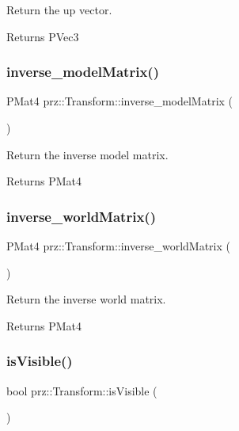 Return the up vector. 

\begin{DoxyReturn}{Returns}
P\+Vec3 
\end{DoxyReturn}
\mbox{\label{classprz_1_1_transform_a7d3ed4bf1ab8efed786e48632b70422e}} 
\subsubsection{\texorpdfstring{inverse\_modelMatrix()}{inverse\_modelMatrix()}}
{\footnotesize\ttfamily P\+Mat4 prz\+::\+Transform\+::inverse\+\_\+model\+Matrix (\begin{DoxyParamCaption}{ }\end{DoxyParamCaption})}



Return the inverse model matrix. 

\begin{DoxyReturn}{Returns}
P\+Mat4 
\end{DoxyReturn}
\mbox{\label{classprz_1_1_transform_a729dc939d6f4ac013bcf2a675c5521c4}} 
\subsubsection{\texorpdfstring{inverse\_worldMatrix()}{inverse\_worldMatrix()}}
{\footnotesize\ttfamily P\+Mat4 prz\+::\+Transform\+::inverse\+\_\+world\+Matrix (\begin{DoxyParamCaption}{ }\end{DoxyParamCaption})}



Return the inverse world matrix. 

\begin{DoxyReturn}{Returns}
P\+Mat4 
\end{DoxyReturn}
\mbox{\label{classprz_1_1_transform_ac455a3f32172f648099c178cddd6880f}} 
\subsubsection{\texorpdfstring{isVisible()}{isVisible()}}
{\footnotesize\ttfamily bool prz\+::\+Transform\+::is\+Visible (\begin{DoxyParamCaption}{ }\end{DoxyParamCaption})}



